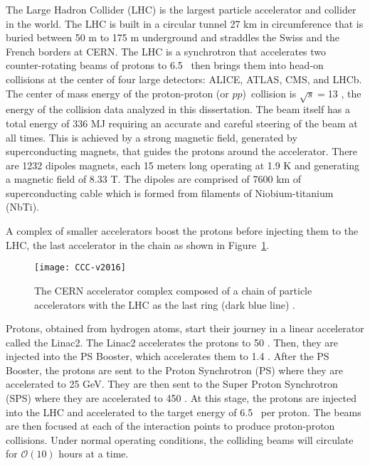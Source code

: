 The Large Hadron Collider (LHC) is the largest 
particle accelerator and collider in the world.
The LHC is built in a circular tunnel 27 km in circumference 
that is buried between 50 m to 175 m underground 
and straddles the Swiss and the French borders 
at CERN.
The LHC is a synchrotron that accelerates two counter-rotating beams of
protons  to 6.5 \TeV~then brings them into head-on collisions at the center of 
four large detectors: ALICE, ATLAS, CMS, and LHCb. The center of mass energy of the proton-proton (or $pp$)\
collision is $\sqrt{s}=$13 \TeV, the energy of the collision data analyzed in this dissertation.
The beam itself has a total energy of 336 MJ requiring an accurate and careful steering 
of the beam at all times.
This is achieved by a strong magnetic field, generated by 
superconducting magnets, that guides the protons around the accelerator.
There are 1232 dipoles magnets, each 15 meters long operating at 1.9 K and generating a magnetic field of 8.33 T.
The dipoles are comprised of 7600 km of superconducting cable which is formed from filaments of Niobium-titanium (NbTi).

A complex of smaller accelerators boost the protons before
injecting them to the LHC, the last accelerator in the chain as shown in 
Figure~\ref{fig:exp.lhc.CCC}.
\begin{figure}[!htb]
\centering
\texttt{[image: CCC-v2016]}
\caption{The CERN accelerator complex 
composed of a chain of  particle accelerators with
the LHC as the last ring (dark blue line) \cite{DeMelis:2197559}.
}
\label{fig:exp.lhc.CCC}
\end{figure} 
Protons, obtained from hydrogen atoms, start their journey in a linear 
accelerator
called the Linac2. The Linac2 accelerates the protons to 50 \MeV. Then, they are injected into
the PS Booster, which accelerates them to 1.4 \GeV. After the PS Booster, the protons are sent to
the Proton Synchrotron (PS) where they are accelerated to 25 GeV. They are then sent to the Super
Proton Synchrotron (SPS) where they are accelerated to 450 \GeV. 
At this stage, the protons are injected into the LHC and accelerated to the target 
energy of 6.5 \TeV~per proton.
 The beams are then focused at each of the interaction points to produce proton-proton collisions.
Under normal operating conditions, the colliding beams will circulate for $\mathcal{O}\left(10\right)$ hours at a time.

